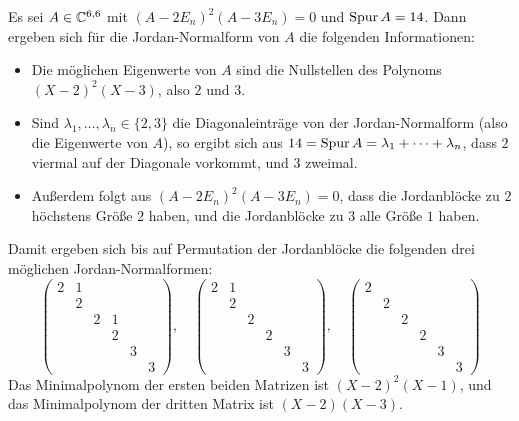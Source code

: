 \documentclass[a4paper,10pt,numbers = noenddot]{scrartcl}
\begin{document}
\begin{example}
  Es sei $A \in \mathbb{C}^{6, 6}$ mit $(A - 2E_n)^2 (A - 3E_n) = 0$ und $\operatorname{Spur} A = 14$.
  Dann ergeben sich für die Jordan-Normalform von $A$ die folgenden Informationen:
  \begin{itemize}
    \item
      Die möglichen Eigenwerte von $A$ sind die Nullstellen des Polynoms $(X-2)^2 (X-3)$, also $2$ und $3$.
    \item
      Sind $\lambda_1, \dotsc, \lambda_n \in \{2, 3\}$ die Diagonaleinträge von der Jordan-Normalform (also die Eigenwerte von $A$), so ergibt sich aus $14 = \operatorname{Spur} A = \lambda_1 + \dotsb + \lambda_n$, dass $2$ viermal auf der Diagonale vorkommt, und $3$ zweimal.
    \item
      Außerdem folgt aus $(A - 2E_n)^2 (A - 3E_n) = 0$, dass die Jordanblöcke zu $2$ höchstens Größe $2$ haben, und die Jordanblöcke zu $3$ alle Größe $1$ haben.
  \end{itemize}
  Damit ergeben sich bis auf Permutation der Jordanblöcke die folgenden drei möglichen Jordan-Normalformen:
  \[
    \begin{pmatrix}
      2 & 1 &   &   &   &   \\
        & 2 &   &   &   &   \\
        &   & 2 & 1 &   &   \\
        &   &   & 2 &   &   \\
        &   &   &   & 3 &   \\
        &   &   &   &   & 3
    \end{pmatrix},
    \quad
    \begin{pmatrix}
      2 & 1 &   &   &   &   \\
        & 2 &   &   &   &   \\
        &   & 2 &   &   &   \\
        &   &   & 2 &   &   \\
        &   &   &   & 3 &   \\
        &   &   &   &   & 3
    \end{pmatrix},
    \quad
    \begin{pmatrix}
      2 &   &   &   &   &   \\
        & 2 &   &   &   &   \\
        &   & 2 &   &   &   \\
        &   &   & 2 &   &   \\
        &   &   &   & 3 &   \\
        &   &   &   &   & 3
    \end{pmatrix}
  \]
  Das Minimalpolynom der ersten beiden Matrizen ist $(X-2)^2 (X-1)$, und das Minimalpolynom der dritten Matrix ist $(X-2)(X-3)$.
\end{example}
\end{document}

